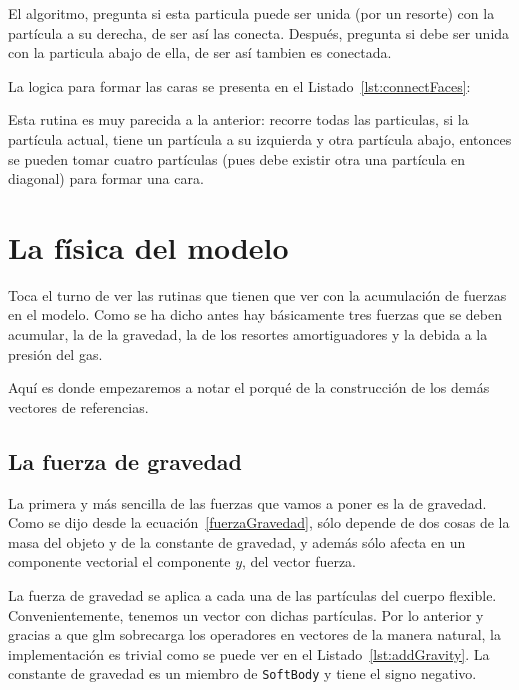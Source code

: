 El algoritmo, pregunta si esta particula puede ser unida (por un resorte) con la partícula a su derecha, de ser así las conecta. Después, pregunta si debe ser unida con la particula abajo de ella, de ser así tambien es conectada.

La logica para formar las caras se presenta en el Listado~\ref{lst:connectFaces}: 

Esta rutina es muy parecida a la anterior: recorre todas las particulas, si la partícula actual, tiene un partícula a su izquierda y otra partícula abajo, entonces se pueden tomar cuatro partículas (pues debe existir otra una partícula en diagonal) para formar una cara.

\section{La física del modelo}
Toca el turno de ver las rutinas que tienen que ver con la acumulación de fuerzas en el modelo.
Como se ha dicho antes hay básicamente tres fuerzas que se deben acumular, la de la gravedad, la de los resortes amortiguadores y la debida a la presión del gas.

Aquí es donde empezaremos a notar el porqué de la construcción de los demás vectores de referencias.

\subsection{La fuerza de gravedad}
La primera y más sencilla de las fuerzas que vamos a poner es la de gravedad.
Como se dijo desde la ecuación~\eqref{fuerzaGravedad}, sólo depende de dos cosas de la masa del objeto y de la constante de gravedad, y además sólo afecta en un componente vectorial el componente $y$, del vector fuerza.

La fuerza de gravedad se aplica a cada una de las partículas del cuerpo flexible. 
Convenientemente, tenemos un vector con dichas partículas.
Por lo anterior y gracias a que glm sobrecarga los operadores en vectores de la manera natural, la implementación es trivial como se puede ver en el Listado~\ref{lst:addGravity}.
La constante de gravedad es un miembro de \texttt{SoftBody} y tiene el signo negativo.

